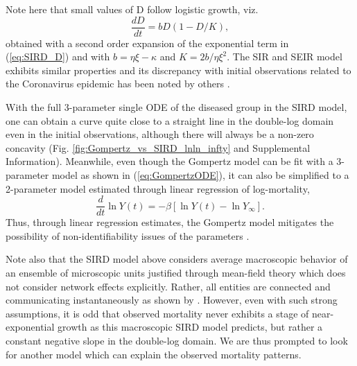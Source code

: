 \documentclass{article}
\begin{document}
Note here that small values of D follow logistic growth, viz.
\begin{equation}
\frac{dD}{dt} = b D (1 - D/K),
\end{equation}
obtained with a second order expansion of the exponential term in (\ref{eq:SIRD_D}) and with $b=\eta\xi - \kappa$ and $K=2b/\eta\xi^2$. The SIR and SEIR model exhibits similar properties and its discrepancy with initial observations related to the Coronavirus epidemic has been noted by others \citep{vattay2020forecasting}.

With the full 3-parameter single ODE of the diseased group in the SIRD model, one can obtain a curve quite close to a straight line in the double-log domain even in the initial observations, although there will always be a non-zero concavity (Fig. \ref{fig:Gompertz_vs_SIRD_lnln_infty} and Supplemental Information).
Meanwhile, even though the Gompertz model can be fit with a 3-parameter model as shown in (\ref{eq:GompertzODE}), it can also be simplified to a 2-parameter model estimated through linear regression of log-mortality,
\begin{equation}
\label{eq:GompertzODE2param}
\frac{d}{dt}\ln{Y(t)} = -\beta\left[\ln{Y(t)} - \ln {Y_{\infty}}\right].
\end{equation}
Thus, through linear regression estimates, the Gompertz model mitigates the possibility of non-identifiability issues of the parameters \citep{roda2020difficult}.

Note also that the SIRD model above considers average macroscopic behavior of an ensemble of microscopic units justified through mean-field theory \citep{smilkov2014beyond} which does not consider network effects explicitly. Rather, all entities are connected and communicating instantaneously as shown by \citet{mombach2002mean}.
However, even with such strong assumptions, it is odd that observed mortality never exhibits a stage of near-exponential growth as this macroscopic SIRD model predicts, but rather a constant negative slope in the double-log domain. 
We are thus prompted to look for another model which can explain the observed mortality patterns.
\end{document}
